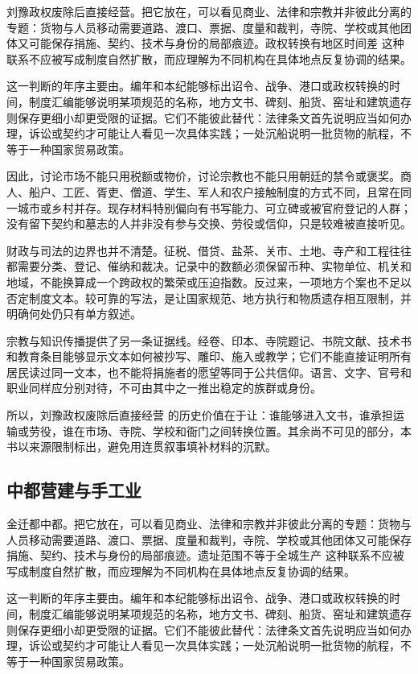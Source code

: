 刘豫政权废除后直接经营。把它放在，可以看见商业、法律和宗教并非彼此分离的专题：货物与人员移动需要道路、渡口、票据、度量和裁判，寺院、学校或其他团体又可能保存捐施、契约、技术与身份的局部痕迹。政权转换有地区时间差 这种联系不应被写成制度自然扩散，而应理解为不同机构在具体地点反复协调的结果。

这一判断的年序主要由。编年和本纪能够标出诏令、战争、港口或政权转换的时间，制度汇编能够说明某项规范的名称，地方文书、碑刻、船货、窑址和建筑遗存则保存更细小却更受限的证据。它们不能彼此替代：法律条文首先说明应当如何办理，诉讼或契约才可能让人看见一次具体实践；一处沉船说明一批货物的航程，不等于一种国家贸易政策。

因此，讨论市场不能只用税额或物价，讨论宗教也不能只用朝廷的禁令或褒奖。商人、船户、工匠、胥吏、僧道、学生、军人和农户接触制度的方式不同，且常在同一城市或乡村并存。现存材料特别偏向有书写能力、可立碑或被官府登记的人群；没有留下契约和墓志的人并非没有参与交换、劳役或信仰，只是较难被直接听见。

财政与司法的边界也并不清楚。征税、借贷、盐茶、关市、土地、寺产和工程往往都需要分类、登记、催纳和裁决。记录中的数额必须保留币种、实物单位、机关和地域，不能换算成一个跨政权的繁荣或压迫指数。反过来，一项地方个案也不足以否定制度文本。较可靠的写法，是让国家规范、地方执行和物质遗存相互限制，并明确何处仍只有单方叙述。

宗教与知识传播提供了另一条证据线。经卷、印本、寺院题记、书院文献、技术书和教育条目能够显示文本如何被抄写、雕印、施入或教学；它们不能直接证明所有居民读过同一文本，也不能将捐施者的愿望等同于公共信仰。语言、文字、官号和职业同样应分别对待，不可由其中之一推出稳定的族群或身份。

所以，刘豫政权废除后直接经营 的历史价值在于让：谁能够进入文书，谁承担运输或劳役，谁在市场、寺院、学校和衙门之间转换位置。其余尚不可见的部分，本书以来源限制标出，避免用连贯叙事填补材料的沉默。

\subsection{中都营建与手工业}

金迁都中都。把它放在，可以看见商业、法律和宗教并非彼此分离的专题：货物与人员移动需要道路、渡口、票据、度量和裁判，寺院、学校或其他团体又可能保存捐施、契约、技术与身份的局部痕迹。遗址范围不等于全城生产 这种联系不应被写成制度自然扩散，而应理解为不同机构在具体地点反复协调的结果。

这一判断的年序主要由。编年和本纪能够标出诏令、战争、港口或政权转换的时间，制度汇编能够说明某项规范的名称，地方文书、碑刻、船货、窑址和建筑遗存则保存更细小却更受限的证据。它们不能彼此替代：法律条文首先说明应当如何办理，诉讼或契约才可能让人看见一次具体实践；一处沉船说明一批货物的航程，不等于一种国家贸易政策。

